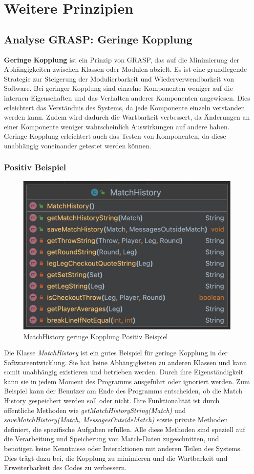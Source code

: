 \chapter{Weitere Prinzipien}
\section{Analyse GRASP: Geringe Kopplung}
\textbf{Geringe Kopplung} ist ein Prinzip von GRASP, das auf die Minimierung der Abhängigkeiten zwischen Klassen oder Modulen abzielt. Es ist eine grundlegende Strategie zur Steigerung der Modulierbarkeit und Wiederverwendbarkeit von Software. Bei geringer Kopplung sind einzelne Komponenten weniger auf die internen Eigenschaften und das Verhalten anderer Komponenten angewiesen. Dies erleichtert das Verständnis des Systems, da jede Komponente einzeln verstanden werden kann. Zudem wird dadurch die Wartbarkeit verbessert, da Änderungen an einer Komponente weniger wahrscheinlich Auswirkungen auf andere haben. Geringe Kopplung erleichtert auch das Testen von Komponenten, da diese unabhängig voneinander getestet werden können.
\subsection{Positiv Beispiel}
\begin{figure}[ht]
    \centering
    \includegraphics[width=0.7\linewidth]{Bilder/MatchHistoryUML.png}
    \caption{MatchHistory geringe Kopplung Positiv Beispiel}
    \label{fig:matchhistory-uml}
\end{figure}
Die Klasse \textit{MatchHistory} ist ein gutes Beispiel für geringe Kopplung in der Softwareentwicklung. Sie hat keine Abhängigkeiten zu anderen Klassen und kann somit unabhängig existieren und betrieben werden. Durch ihre Eigenständigkeit kann sie in jedem Moment des Programms ausgeführt oder ignoriert werden. Zum Beispiel kann der Benutzer am Ende des Programms entscheiden, ob die Match History gespeichert werden soll oder nicht. Ihre Funktionalität ist durch öffentliche Methoden wie \textit{getMatchHistoryString(Match)} und \textit{saveMatchHistory(Match, MessagesOutsideMatch)} sowie private Methoden definiert, die spezifische Aufgaben erfüllen. Alle diese Methoden sind speziell auf die Verarbeitung und Speicherung von Match-Daten zugeschnitten, und benötigen keine Kenntnisse oder Interaktionen mit anderen Teilen des Systems. Dies trägt dazu bei, die Kopplung zu minimieren und die Wartbarkeit und Erweiterbarkeit des Codes zu verbessern.

